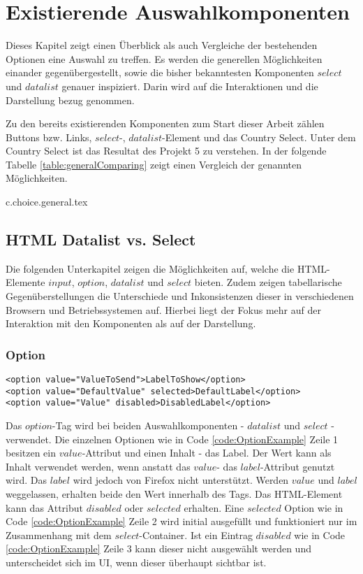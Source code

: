 \chapter{Existierende Auswahlkomponenten}

Dieses Kapitel zeigt einen Überblick als auch Vergleiche der bestehenden Optionen eine Auswahl zu treffen. 
Es werden die generellen Möglichkeiten einander gegenübergestellt, sowie die bisher bekanntesten Komponenten $select$ und $datalist$ genauer inspiziert.
Darin wird auf die Interaktionen und die Darstellung bezug genommen. 

Zu den bereits existierenden Komponenten zum Start dieser Arbeit zählen Buttons bzw. Links, $select$-, $datalist$-Element und das Country Select.
Unter dem Country Select ist das Resultat des Projekt 5 zu verstehen.
In der folgende Tabelle \ref{table:generalComparing} zeigt einen Vergleich der genannten Möglichkeiten.

{c.choice.general.tex}

\section{HTML Datalist vs. Select}

Die folgenden Unterkapitel zeigen die Möglichkeiten auf, welche die HTML-Elemente $input$, $option$, $datalist$ und $select$ bieten.
Zudem zeigen tabellarische Gegenüberstellungen die Unterschiede und Inkonsistenzen dieser in verschiedenen Browsern und Betriebssystemen auf.
Hierbei liegt der Fokus mehr auf der Interaktion mit den Komponenten als auf der Darstellung.


\subsection{Option}

\begin{lstlisting}[language = html5, caption = Option Example, label = code:OptionExample]
<option value="ValueToSend">LabelToShow</option>
<option value="DefaultValue" selected>DefaultLabel</option>
<option value="Value" disabled>DisabledLabel</option>
\end{lstlisting}

Das $option$-Tag wird bei beiden Auswahlkomponenten - $datalist$ und $select$ - verwendet. 
Die einzelnen Optionen wie in Code \ref{code:OptionExample} Zeile 1 besitzen ein $value$-Attribut und einen Inhalt - das Label.
Der Wert kann als Inhalt verwendet werden, wenn anstatt das $value$- das $label$-Attribut genutzt wird.
Das $label$ wird jedoch von Firefox nicht unterstützt.
Werden $value$ und $label$ weggelassen, erhalten beide den Wert innerhalb des Tags.
Das HTML-Element kann das Attribut $disabled$ oder $selected$ erhalten.
Eine $selected$ Option wie in Code \ref{code:OptionExample} Zeile 2 wird initial ausgefüllt und funktioniert nur im Zusammenhang mit dem $select$-Container. 
Ist ein Eintrag $disabled$ wie in Code \ref{code:OptionExample} Zeile 3 kann dieser nicht ausgewählt werden und unterscheidet sich im UI, wenn dieser überhaupt sichtbar ist.

